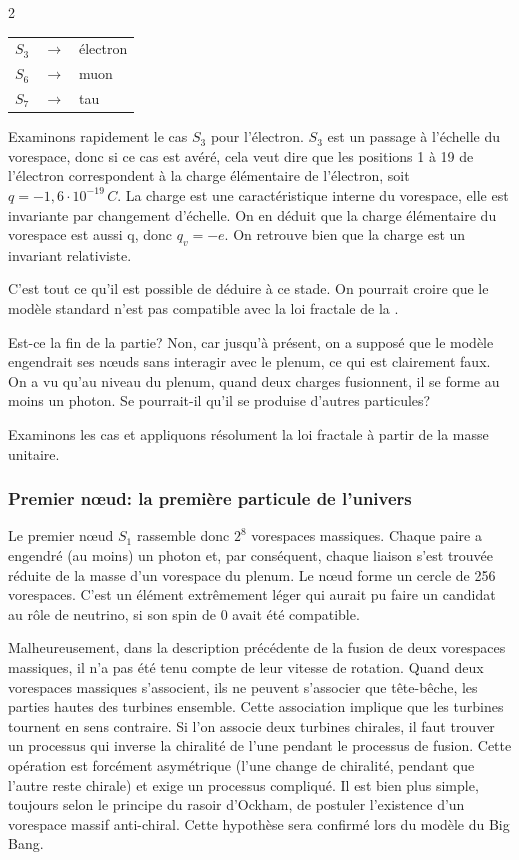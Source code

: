 \begin{multicols}{2}
\begin{center}
\begin{tabular}{ c c l }
	$S_3$ & $\rightarrow$ & électron \\
	$S_6$ & $\rightarrow$ & muon     \\
	$S_7$ & $\rightarrow$ & tau 
\end{tabular}
\end{center}

Examinons rapidement le cas $S_3$ pour l'électron. $S_3$ est un passage à
l'échelle du vorespace, donc si ce cas est avéré, cela veut dire que
les positions 1 à 19 de l'électron correspondent à la charge
élémentaire de l'électron, soit $q=-1,6\cdot10^{-19}\,C$. La charge est une
caractéristique interne du vorespace, elle est invariante par
changement d'échelle. On en déduit que la charge élémentaire du
vorespace est aussi q, donc $q_v=-e$. On retrouve bien que la charge est
un invariant relativiste.

C'est tout ce qu'il est possible de déduire à ce stade. On pourrait croire
que le modèle standard n'est pas compatible avec la loi fractale de la \PQ.

Est-ce la fin de la partie? Non, car jusqu'à présent, on a supposé
que le modèle engendrait ses nœuds sans interagir avec le plenum, ce
qui est clairement faux. On a vu qu'au niveau du plenum, quand deux
charges fusionnent, il se forme au moins un photon. Se pourrait-il
qu'il se produise d'autres particules?

Examinons les cas et appliquons résolument la loi fractale à partir de
la masse unitaire.

\subsubsection{Premier nœud: la première particule de l'univers}

Le premier nœud $S_1$ rassemble donc $2^8$ vorespaces massiques. Chaque
paire a engendré (au moins) un photon et, par conséquent, chaque
liaison s'est trouvée réduite de la masse d'un vorespace du plenum. Le
nœud forme un cercle de 256 vorespaces. C'est un élément extrêmement
léger qui aurait pu faire un candidat au rôle de neutrino, si son spin
de 0 avait été compatible.

Malheureusement, dans la description précédente de la fusion de deux
vorespaces massiques, il n'a pas été tenu compte de leur vitesse de
rotation. Quand deux vorespaces massiques s'associent, ils ne peuvent
s'associer que tête-bêche, les parties hautes des turbines ensemble.
Cette association implique que les turbines tournent en sens
contraire. Si l'on associe deux turbines chirales, il faut trouver un
processus qui inverse la chiralité de l'une pendant le processus de
fusion. Cette opération est forcément asymétrique (l'une change de
chiralité, pendant que l'autre reste chirale) et exige un processus
compliqué. Il est bien plus simple, toujours selon le principe du rasoir d'Ockham,
de postuler l'existence d'un vorespace massif anti-chiral. Cette
hypothèse sera confirmé lors du modèle du Big Bang.


\end{multicols}
